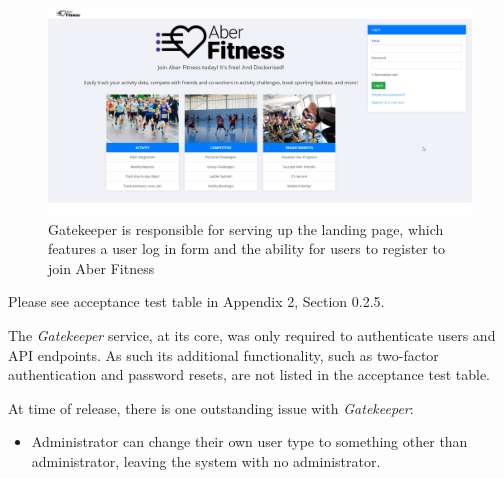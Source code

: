 \begin{figure}[H]
    \centering
    \includegraphics[width=\textwidth]{Images/service_landing_page.png}
    \caption{Gatekeeper is responsible for serving up the landing page, which features a user log in form and the ability for users to register to join Aber Fitness}
\end{figure}

Please see acceptance test table in Appendix 2, Section 0.2.5.

The \textit{Gatekeeper} service, at its core, was only required to authenticate users and API endpoints. As such its additional functionality, such as two-factor authentication and password resets, are not listed in the acceptance test table. 

At time of release, there is one outstanding issue with \textit{Gatekeeper}: 

\begin{itemize}
	\item Administrator can change their own user type to something other than administrator, leaving the system with no administrator.
\end{itemize}